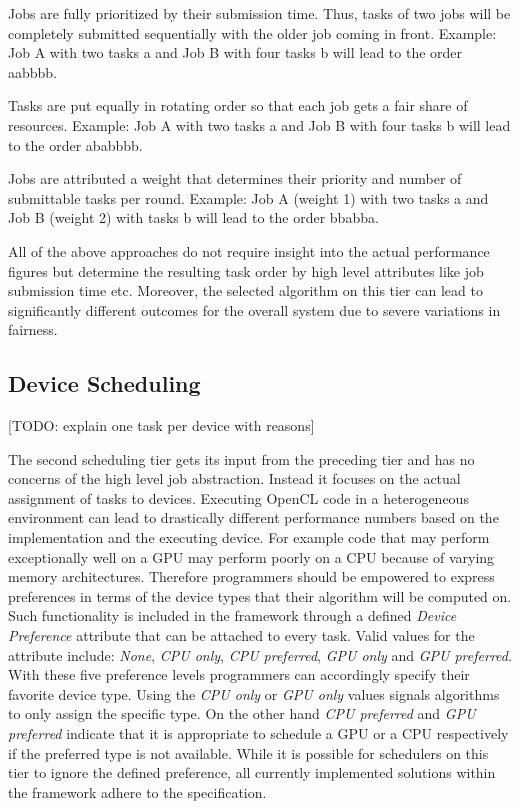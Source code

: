 \begin{description}[style=nextline]
	\item[First-In First-Out] 
	Jobs are fully prioritized by their submission time. Thus, tasks of two jobs will be completely submitted sequentially with the older job coming in front. Example: Job A with two tasks a and Job B with four tasks b will lead to the order aabbbb.
	\item[Round-Robin] 
	Tasks are put equally in rotating order so that each job gets a fair share of resources. Example: Job A with two tasks a and Job B with four tasks b will lead to the order ababbbb.
	\item[Weighted Fair Sharing] 
	Jobs are attributed a weight that determines their priority and number of submittable tasks per round. Example: Job A (weight 1) with two tasks a and Job B (weight 2) with tasks b will lead to the order bbabba.
\end{description}

All of the above approaches do not require insight into the actual performance figures but determine the resulting task order by high level attributes like job submission time etc. Moreover, the selected algorithm on this tier can lead to significantly different outcomes for the overall system due to severe variations in fairness.

\subsection*{Device Scheduling}
[TODO: explain one task per device with reasons]

The second scheduling tier gets its input from the preceding tier and has no concerns of the high level job abstraction. Instead it focuses on the actual assignment of tasks to devices. Executing OpenCL code in a heterogeneous environment can lead to drastically different performance numbers based on the implementation and the executing device. For example code that may perform exceptionally well on a GPU may perform poorly on a CPU because of varying memory architectures. Therefore programmers should be empowered to express preferences in terms of the device types that their algorithm will be computed on. Such functionality is included in the framework through a defined \textit{Device Preference} attribute that can be attached to every task. Valid values for the attribute include: \textit{None}, \textit{CPU only}, \textit{CPU preferred}, \textit{GPU only} and \textit{GPU preferred}. With these five preference levels programmers can accordingly specify their favorite device type. Using the \textit{CPU only} or \textit{GPU only} values signals algorithms to only assign the specific type. On the other hand \textit{CPU preferred} and \textit{GPU preferred} indicate that it is appropriate to schedule a GPU or a CPU respectively if the preferred type is not available. While it is possible for schedulers on this tier to ignore the defined preference, all currently implemented solutions within the framework adhere to the specification.

